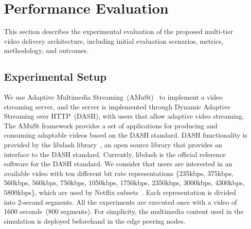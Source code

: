 \section{Performance Evaluation}
\label{sec:results}

This section describes the experimental evaluation of the proposed multi-tier video delivery architecture, including initial evaluation scenarios, metrics, methodology, and outcomes.
 
%

\subsection{Experimental Setup}


We use Adaptive Multimedia Streaming~(AMuSt)~\cite{kreuzberger2016amust} to implement a video streaming server, and the server is implemented through Dynamic Adaptive Streaming over HTTP~(DASH), with users that allow adaptive video streaming. The AMuSt framework provides a set of applications for producing and consuming adaptable videos based on the DASH standard. DASH functionality is provided by the libdash library~\cite{mueller2013ICMEW}, an open source library that provides an interface to the DASH standard. Currently, libdash is the official reference software for the DASH standard. We consider that users are interested in an available video with ten different bit rate representations \{235kbps, 375kbps, 560kbps, 560kbps, 750kbps, 1050kbps, 1750kbps, 2350kbps, 3000kbps, 4300kbps, 5800kbps\}, which are used by Netflix subsets~\cite{netflix:representation}. Each representation is divided into 2-second segments. All the experiments are executed once with a video of 1600 seconds~(800 segments). 
For simplicity, the multimedia content used in the simulation is deployed beforehand in the edge peering nodes. 

